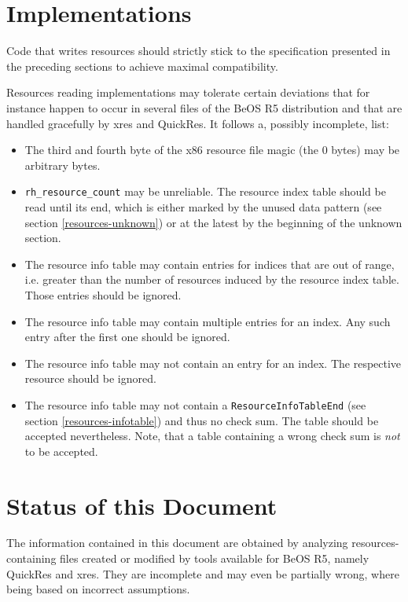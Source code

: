 \documentclass[12pt, a4paper]{article}
\newcommand{\code}[1]{{\tt #1}}
\begin{document}
\section{Implementations}
\label{implementations}

Code that writes resources should strictly stick to the specification
presented in the preceding sections to achieve maximal compatibility.

Resources reading implementations may tolerate certain deviations that
for instance happen to occur in several files of the BeOS R5 distribution
and that are handled gracefully by xres and QuickRes. It follows a, possibly
incomplete, list:
%
\begin{itemize}
\item{The third and fourth byte of the x86 resource file magic (the 0 bytes)
  may be arbitrary bytes.}
\item{\code{rh\_resource\_count} may be unreliable. The resource index table
  should be read until its end, which is either marked by the unused data
  pattern (see section \ref{resources-unknown}) or at the latest by the
  beginning of the unknown section.}
\item{The resource info table may contain entries for indices that are out
  of range, i.e. greater than the number of resources induced by the resource
  index table. Those entries should be ignored.}
\item{The resource info table may contain multiple entries for an index.
  Any such entry after the first one should be ignored.}
\item{The resource info table may not contain an entry for an index.
  The respective resource should be ignored.}
\item{The resource info table may not contain a \code{ResourceInfoTableEnd}
  (see section \ref{resources-infotable}) and thus no check sum. The table
  should be accepted nevertheless. Note, that a table containing a wrong check
  sum is {\em not} to be accepted.}
\end{itemize}



\section{Status of this Document}
\label{status}

The information contained in this document are obtained by analyzing
resources-containing files created or modified by tools available for BeOS R5,
namely QuickRes and xres. They are incomplete and may even be partially wrong,
where being based on incorrect assumptions.
\end{document}
